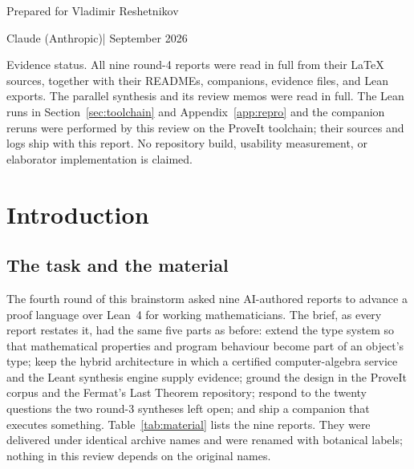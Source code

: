 \documentclass[11pt,a4paper]{article}
\theoremstyle{definition}
\theoremstyle{plain}
\begin{document}
\begin{titlepage}
\begin{keybox}
\end{keybox}
\vfill
{\sffamily Prepared for Vladimir Reshetnikov\par}
{\sffamily Claude (Anthropic)\quad| September 2026\par}
\vspace{4mm}
{\small\color{muted}Evidence status. All nine round-4 reports were read in full from their \LaTeX{} sources, together with their READMEs, companions, evidence files, and Lean exports. The parallel synthesis and its review memos were read in full. The Lean runs in Section~\ref{sec:toolchain} and Appendix~\ref{app:repro} and the companion reruns were performed by this review on the ProveIt toolchain; their sources and logs ship with this report. No repository build, usability measurement, or elaborator implementation is claimed.\par}
\end{titlepage}

\begingroup\small\setlength{\parskip}{0pt}\tableofcontents\endgroup
\clearpage

\section{Introduction}\label{sec:intro}

\subsection{The task and the material}\label{sec:material}
The fourth round of this brainstorm asked nine AI-authored reports to advance a proof language over Lean~4 for working mathematicians. The brief, as every report restates it, had the same five parts as before: extend the type system so that mathematical properties and program behaviour become part of an object's type; keep the hybrid architecture in which a certified computer-algebra service and the Leant synthesis engine supply evidence; ground the design in the ProveIt corpus and the Fermat's Last Theorem repository; respond to the twenty questions the two round-3 syntheses left open; and ship a companion that executes something. Table~\ref{tab:material} lists the nine reports. They were delivered under identical archive names and were renamed with botanical labels; nothing in this review depends on the original names.
\end{document}
